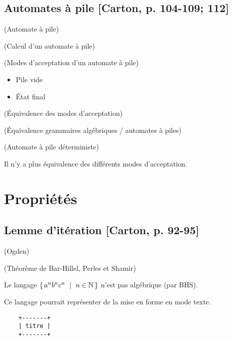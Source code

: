 \documentclass[../../agregation.tex]{subfiles}
\begin{document}
\subsection{Automates à pile {[}Carton, p. 104-109; 112{]}}
\begin{defn}
	(Automate à pile)
\end{defn}

\begin{defn}
	(Calcul d'un automate à pile)
\end{defn}

\begin{defn}
	(Modes d'acceptation d'un automate à pile)
	\begin{itemize}
		\item Pile vide
		\item État final
	\end{itemize}
\end{defn}
\begin{prop}
	(Équivalence des modes d'acceptation)\end{prop}
\begin{thm}
	(Équivalence grammaires algébriques / automates à piles)\end{thm}
\begin{defn}
	(Automate à pile déterministe)\end{defn}
\begin{rem}
	Il n'y a plus équivalence des différents modes d'acceptation.
\end{rem}

\section{Propriétés}


\subsection{Lemme d'itération {[}Carton, p. 92-95{]}}
\begin{lem}
	(Ogden)\end{lem}
\begin{cor}
	(Théorème de Bar-Hillel, Perles et Shamir)\end{cor}
\begin{claim}
	Le langage $\set{a^{n}b^{n}c^{n}\ |\ n\in\N}$ n'est pas algébrique
	(par BHS).\end{claim}
\begin{example}
	Ce langage pourrait représenter de la mise en forme en mode texte.
	
	\begin{lstlisting}
	+-------+
	| titre |
	+-------+
	\end{lstlisting}
	
\end{example}
\end{document}

